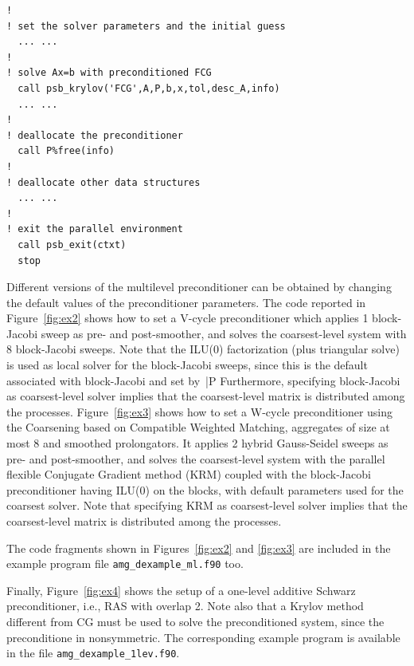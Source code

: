 \begin{listing}[tbp]
\begin{center}
\begin{minipage}{.90\textwidth}
{\begin{verbatim}
!
! set the solver parameters and the initial guess
  ... ...
!
! solve Ax=b with preconditioned FCG
  call psb_krylov('FCG',A,P,b,x,tol,desc_A,info)
  ... ...
!
! deallocate the preconditioner
  call P%free(info)
!
! deallocate other data structures
  ... ...
!
! exit the parallel environment
  call psb_exit(ctxt)
  stop
\end{verbatim}
}
\fi
\end{minipage}
\caption{setup and application of the default multilevel preconditioner (example 1).
\label{fig:ex1}}
\end{center}
\end{listing}
Different versions of the multilevel preconditioner can be obtained by changing
the default values of the preconditioner parameters. The code reported in
Figure~\ref{fig:ex2} shows how to set a V-cycle preconditioner
which applies 1 block-Jacobi sweep as pre- and post-smoother,
and solves the coarsest-level system with 8 block-Jacobi sweeps.
Note that the ILU(0) factorization (plus triangular solve) is used as
local solver for the block-Jacobi sweeps, since this is the default associated
with block-Jacobi and set by~\fortinline|P%
Furthermore, specifying block-Jacobi as coarsest-level
solver implies that the coarsest-level matrix is distributed
among the processes.
Figure~\ref{fig:ex3} shows how to set a W-cycle preconditioner using
the Coarsening based on Compatible Weighted Matching, aggregates of
size at most $8$ and smoothed prolongators. It applies 
2 hybrid Gauss-Seidel sweeps as pre- and post-smoother,
and solves the coarsest-level system with the parallel flexible
Conjugate Gradient method (KRM) coupled with the block-Jacobi
preconditioner having ILU(0) on the blocks, with  default parameters
used for the coarsest solver. 
Note that specifying KRM as coarsest-level
solver implies that the coarsest-level matrix is distributed
among the processes.



The code fragments shown in Figures~\ref{fig:ex2} and \ref{fig:ex3} are
included in the example program file \verb|amg_dexample_ml.f90| too.

Finally, Figure~\ref{fig:ex4} shows the setup of a one-level
additive Schwarz preconditioner, i.e., RAS with overlap 2.
Note also that a Krylov method different from CG must be used to solve
the preconditioned system, since the preconditione in nonsymmetric.
The corresponding example program is available in the file
\verb|amg_dexample_1lev.f90|.


